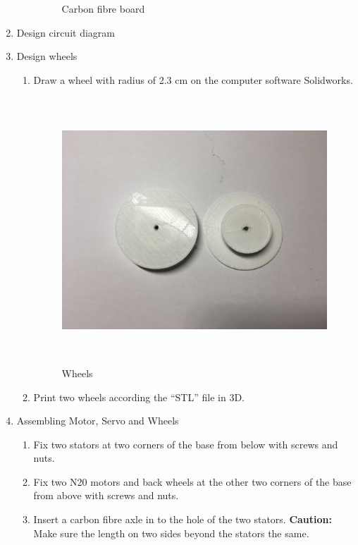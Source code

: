 \begin{enumerate}
\begin{enumerate}
\begin{figure}
\begin{center}
	\end{center}
 	\caption{Carbon fibre board \label{fig:carbonFiberBoard}}
	\end{figure}
	\end{enumerate}
\item Design circuit diagram 
\item Design wheels
	\begin{enumerate}
	\item Draw a wheel with radius of 2.3 cm on the computer software Solidworks.\\
	\begin{figure}
	\begin{center}
	\includegraphics[height=10cm]{figure/procedure/p3}
	\end{center}
 	\caption{Wheels \label{fig:wheels}}
	\end{figure}
	\item Print two wheels according the ``STL'' file in 3D.
	\end{enumerate}
\item Assembling Motor, Servo and Wheels
	\begin{enumerate}
	\item Fix two stators at two corners of the base from below with screws and nuts. 
	\item Fix two N20 motors and back wheels at the other two corners of the base from above with screws and nuts.
	\item Insert a carbon fibre axle in to the hole of the two stators. \textbf{Caution:} Make sure the length on two sides beyond the stators the same. \\

\end{enumerate}
\end{enumerate}
